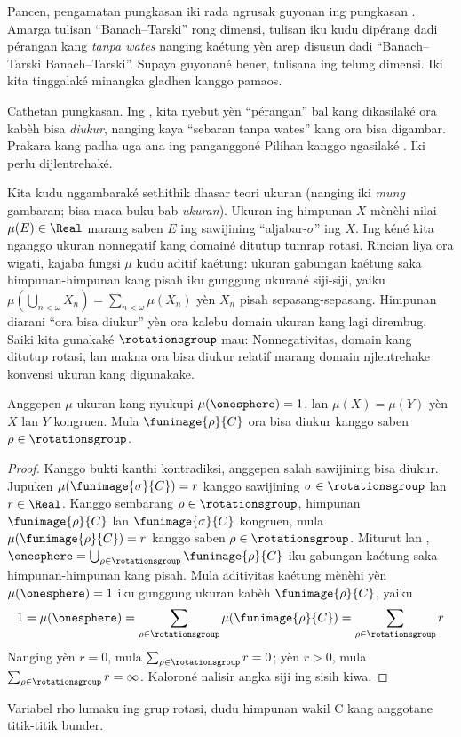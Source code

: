 \documentclass[../../../include/open-logic-section]{subfiles}
\begin{document}
Pancen, pengamatan pungkasan iki rada ngrusak guyonan ing pungkasan
. Amarga tulisan ``Banach--Tarski'' rong dimensi,
tulisan iku kudu dipérang dadi pérangan kang \emph{tanpa wates}
nanging kaétung yèn arep disusun dadi ``Banach--Tarski
Banach--Tarski''. Supaya guyonané bener, tulisana ing telung
dimensi. Iki kita tinggalaké minangka gladhen kanggo pamaos.

Cathetan pungkasan. Ing , kita nyebut yèn
``pérangan'' bal kang dikasilaké ora kabèh bisa \emph{diukur}, nanging
kaya ``sebaran tanpa wates'' kang ora bisa digambar. Prakara kang
padha uga ana ing panganggoné Pilihan kanggo ngasilaké
. Iki perlu dijlentrehaké.

Kita kudu nggambaraké sethithik dhasar teori ukuran (nanging iki
\emph{mung} gambaran; bisa maca buku bab
\emph{ukuran}). Ukuran ing himpunan $X$ mènèhi nilai
$\mu(E) \in \Real$ marang saben $E$ ing sawijining
``aljabar-$\sigma$'' ing $X$. Ing kéné kita nganggo ukuran
nonnegatif kang domainé ditutup tumrap rotasi. Rincian liya
ora wigati, kajaba fungsi $\mu$ kudu aditif kaétung:
ukuran gabungan kaétung saka himpunan-himpunan kang pisah iku
gunggung ukurané siji-siji, yaiku
$\mu(\bigcup_{n < \omega} X_n) = \sum_{n < \omega}\mu(X_n)$
yèn $X_n$ pisah sepasang-sepasang. Himpunan diarani ``ora bisa
diukur'' yèn ora kalebu domain ukuran kang lagi dirembug.
Saiki kita gunakaké $\rotationsgroup$ mau:
Nonnegativitas, domain kang ditutup rotasi, lan makna ora bisa diukur relatif marang domain njlentrehake konvensi ukuran kang digunakake.

\begin{cor}[Vitali]
Anggepen $\mu$ ukuran kang nyukupi $\mu(\onesphere) = 1$,
lan $\mu(X) = \mu(Y)$ yèn $X$ lan $Y$ kongruen. Mula
$\funimage{\rho}{C}$ ora bisa diukur kanggo saben
$\rho \in \rotationsgroup$.
\end{cor}

\begin{proof}
Kanggo bukti kanthi kontradiksi, anggepen salah sawijining bisa
diukur. Jupuken $\mu(\funimage{\sigma}{C}) = r$ kanggo sawijining
$\sigma \in \rotationsgroup$ lan $r \in \Real$. Kanggo sembarang
$\rho \in \rotationsgroup$, himpunan $\funimage{\rho}{C}$ lan
$\funimage{\sigma}{C}$ kongruen, mula
$\mu(\funimage{\rho}{C}) = r$ kanggo saben
$\rho \in \rotationsgroup$. Miturut  lan
, $\onesphere =
\bigcup_{\rho \in \rotationsgroup}\funimage{\rho}{C}$ iku
gabungan kaétung saka himpunan-himpunan kang pisah. Mula
aditivitas kaétung mènèhi yèn $\mu(\onesphere) = 1$ iku
gunggung ukuran kabèh $\funimage{\rho}{C}$, yaiku
\[
	1 = \mu(\onesphere) = \sum_{\rho \in \rotationsgroup}\mu(\funimage{\rho}{C}) = \sum_{\rho \in \rotationsgroup}r
\]
Nanging yèn $r = 0$, mula $\sum_{\rho \in \rotationsgroup}r = 0$;
yèn $r > 0$, mula $\sum_{\rho \in \rotationsgroup}r = \infty$.
Kaloroné nalisir angka siji ing sisih kiwa.
\end{proof}
Variabel rho lumaku ing grup rotasi, dudu himpunan wakil C kang anggotane titik-titik bunder.
\end{document}
